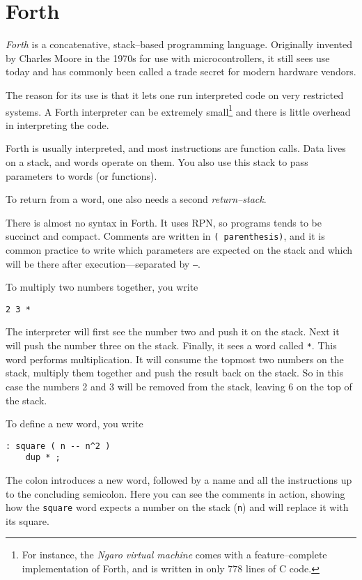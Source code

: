 \section{Forth}

\textit{Forth} is a concatenative, stack--based programming language.
Originally invented by Charles Moore in the 1970s for use with
microcontrollers, it still sees use today and has commonly been called a
trade secret for modern hardware vendors.

The reason for its use is that it lets one run interpreted code on very
restricted systems. A Forth interpreter can be extremely small\footnote{For
instance, the \textit{Ngaro virtual machine} comes with a feature--complete
implementation of Forth, and is written in only 778 lines of C code.}
and there is little overhead in interpreting the code.

Forth is usually interpreted, and most instructions are function calls.
Data lives on a stack, and words operate on them.  You also use this stack
to pass parameters to words (or functions).

To return from a word, one also needs a second \textit{return--stack}.

There is almost no syntax in Forth.  It uses \ac{RPN}, so programs tends to
be succinct and compact.  Comments are written in \texttt{( parenthesis)},
and it is common practice to write which parameters are expected on the
stack and which will be there after execution---separated by \texttt{--}.

To multiply two numbers together, you write

\begin{verbatim}
2 3 *
\end{verbatim}

The interpreter will first see the number two and push it on the stack. Next
it will push the number three on the stack. Finally, it sees a word called
\texttt{*}.  This word performs multiplication. It will consume the topmost
two numbers on the stack, multiply them together and push the result back on
the stack. So in this case the numbers 2 and 3 will be removed from the
stack, leaving 6 on the top of the stack.

To define a new word, you write

\begin{verbatim}
: square ( n -- n^2 )
    dup * ;
\end{verbatim}

The colon introduces a new word, followed by a name and all the instructions
up to the concluding semicolon.  Here you can see the comments in action,
showing how the \texttt{square} word expects a number on the stack
(\texttt{n}) and will replace it with its square.

